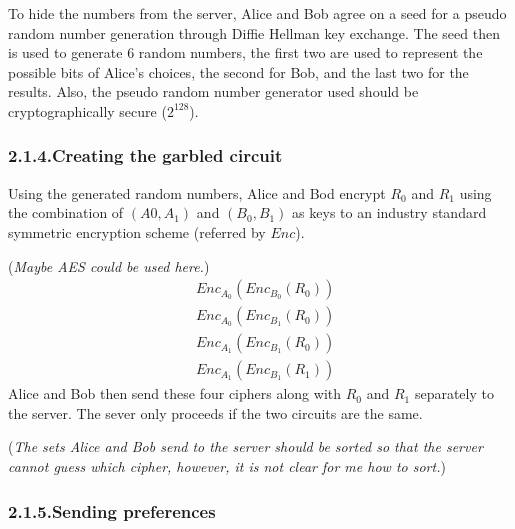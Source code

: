 \documentclass{article}
\begin{document}
\noindent{}To hide the numbers from the server, Alice and Bob agree on a seed for a pseudo random number generation through Diffie Hellman key exchange. The seed then is used to generate 6 random numbers, the first two are used to represent the possible bits of Alice’s choices, the second for Bob, and the last two for the results. Also, the pseudo random number generator used should be cryptographically secure ($2^{128}$).%

\subsubsection{2.1.4.\hspace*{0.5em}Creating the garbled circuit}\label{sec-creating-the-garbled-circuit}%

\noindent{}Using the generated random numbers, Alice and Bod encrypt $R_{0}$ and $R_{1}$ using the combination of $(A{0}, A_{1})$ and $(B_{0}, B_{1})$ as keys to an industry standard symmetric encryption scheme (referred by $Enc$).%

(\emph{Maybe AES could be used here.})%
\noindent\noindent\[%
\begin{aligned}
&Enc_{A_{0}}(Enc_{B_{0}}(R_{0})) \\
&Enc_{A_{0}}(Enc_{B_{1}}(R_{0})) \\
&Enc_{A_{1}}(Enc_{B_{1}}(R_{0})) \\
&Enc_{A_{1}}(Enc_{B_{1}}(R_{1}))
\end{aligned}
\]%
\noindent{}Alice and Bob then send these four ciphers along with $R_{0}$ and $R_{1}$ separately to the server. The sever only proceeds if the two circuits are the same. 

(\emph{The sets Alice and Bob send to the server should be sorted so that the server cannot guess which cipher, however, it is not clear for me how to sort.})%

\subsubsection{2.1.5.\hspace*{0.5em}Sending preferences}\label{sec-sending-preferences}%
\end{document}
